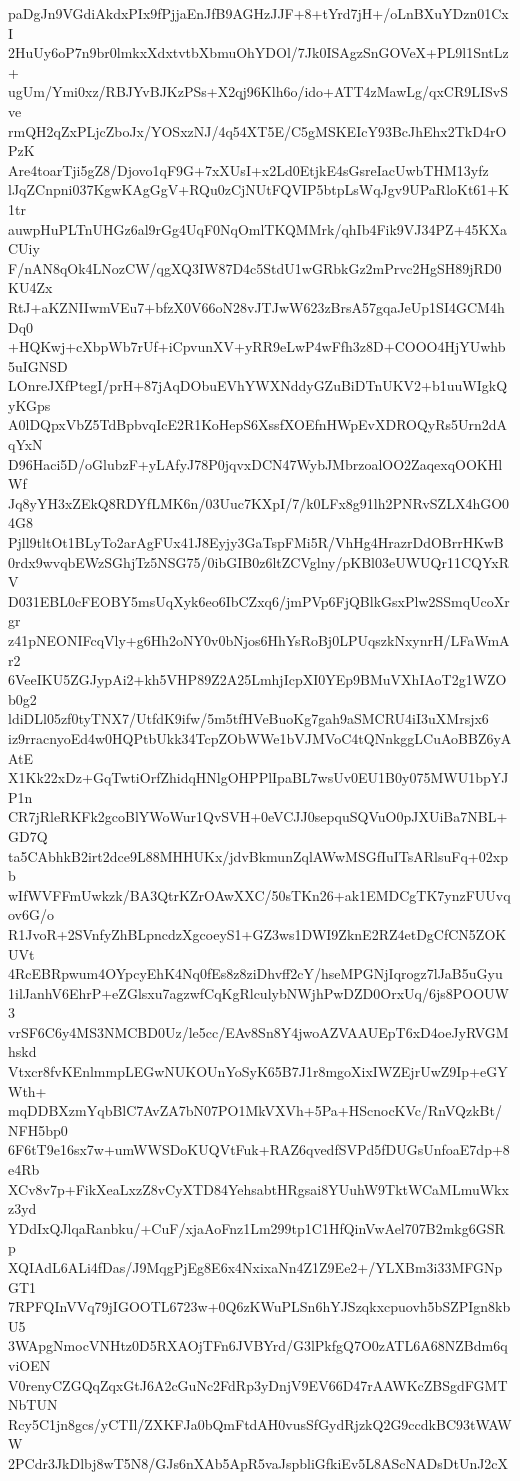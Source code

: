 paDgJn9VGdiAkdxPIx9fPjjaEnJfB9AGHzJJF+8+tYrd7jH+/oLnBXuYDzn01CxI
2HuUy6oP7n9br0lmkxXdxtvtbXbmuOhYDOl/7Jk0ISAgzSnGOVeX+PL9l1SntLz+
ugUm/Ymi0xz/RBJYvBJKzPSs+X2qj96Klh6o/ido+ATT4zMawLg/qxCR9LISvSve
rmQH2qZxPLjcZboJx/YOSxzNJ/4q54XT5E/C5gMSKEIcY93BcJhEhx2TkD4rOPzK
Are4toarTji5gZ8/Djovo1qF9G+7xXUsI+x2Ld0EtjkE4sGsreIacUwbTHM13yfz
lJqZCnpni037KgwKAgGgV+RQu0zCjNUtFQVIP5btpLsWqJgv9UPaRloKt61+K1tr
auwpHuPLTnUHGz6al9rGg4UqF0NqOmlTKQMMrk/qhIb4Fik9VJ34PZ+45KXaCUiy
F/nAN8qOk4LNozCW/qgXQ3IW87D4c5StdU1wGRbkGz2mPrvc2HgSH89jRD0KU4Zx
RtJ+aKZNIIwmVEu7+bfzX0V66oN28vJTJwW623zBrsA57gqaJeUp1SI4GCM4hDq0
+HQKwj+cXbpWb7rUf+iCpvunXV+yRR9eLwP4wFfh3z8D+COOO4HjYUwhb5uIGNSD
LOnreJXfPtegI/prH+87jAqDObuEVhYWXNddyGZuBiDTnUKV2+b1uuWIgkQyKGps
A0lDQpxVbZ5TdBpbvqIcE2R1KoHepS6XssfXOEfnHWpEvXDROQyRs5Urn2dAqYxN
D96Haci5D/oGlubzF+yLAfyJ78P0jqvxDCN47WybJMbrzoalOO2ZaqexqOOKHlWf
Jq8yYH3xZEkQ8RDYfLMK6n/03Uuc7KXpI/7/k0LFx8g91lh2PNRvSZLX4hGO04G8
Pjll9tltOt1BLyTo2arAgFUx41J8Eyjy3GaTspFMi5R/VhHg4HrazrDdOBrrHKwB
0rdx9wvqbEWzSGhjTz5NSG75/0ibGIB0z6ltZCVglny/pKBl03eUWUQr11CQYxRV
D031EBL0cFEOBY5msUqXyk6eo6IbCZxq6/jmPVp6FjQBlkGsxPlw2SSmqUcoXrgr
z41pNEONIFcqVly+g6Hh2oNY0v0bNjos6HhYsRoBj0LPUqszkNxynrH/LFaWmAr2
6VeeIKU5ZGJypAi2+kh5VHP89Z2A25LmhjIcpXI0YEp9BMuVXhIAoT2g1WZOb0g2
ldiDLl05zf0tyTNX7/UtfdK9ifw/5m5tfHVeBuoKg7gah9aSMCRU4iI3uXMrsjx6
iz9rracnyoEd4w0HQPtbUkk34TcpZObWWe1bVJMVoC4tQNnkggLCuAoBBZ6yAAtE
X1Kk22xDz+GqTwtiOrfZhidqHNlgOHPPlIpaBL7wsUv0EU1B0y075MWU1bpYJP1n
CR7jRleRKFk2gcoBlYWoWur1QvSVH+0eVCJJ0sepquSQVuO0pJXUiBa7NBL+GD7Q
ta5CAbhkB2irt2dce9L88MHHUKx/jdvBkmunZqlAWwMSGfIuITsARlsuFq+02xpb
wIfWVFFmUwkzk/BA3QtrKZrOAwXXC/50sTKn26+ak1EMDCgTK7ynzFUUvqov6G/o
R1JvoR+2SVnfyZhBLpncdzXgcoeyS1+GZ3ws1DWI9ZknE2RZ4etDgCfCN5ZOKUVt
4RcEBRpwum4OYpcyEhK4Nq0fEs8z8ziDhvff2cY/hseMPGNjIqrogz7lJaB5uGyu
1ilJanhV6EhrP+eZGlsxu7agzwfCqKgRlculybNWjhPwDZD0OrxUq/6js8POOUW3
vrSF6C6y4MS3NMCBD0Uz/le5cc/EAv8Sn8Y4jwoAZVAAUEpT6xD4oeJyRVGMhskd
Vtxcr8fvKEnlmmpLEGwNUKOUnYoSyK65B7J1r8mgoXixIWZEjrUwZ9Ip+eGYWth+
mqDDBXzmYqbBlC7AvZA7bN07PO1MkVXVh+5Pa+HScnocKVc/RnVQzkBt/NFH5bp0
6F6tT9e16sx7w+umWWSDoKUQVtFuk+RAZ6qvedfSVPd5fDUGsUnfoaE7dp+8e4Rb
XCv8v7p+FikXeaLxzZ8vCyXTD84YehsabtHRgsai8YUuhW9TktWCaMLmuWkxz3yd
YDdIxQJlqaRanbku/+CuF/xjaAoFnz1Lm299tp1C1HfQinVwAel707B2mkg6GSRp
XQIAdL6ALi4fDas/J9MqgPjEg8E6x4NxixaNn4Z1Z9Ee2+/YLXBm3i33MFGNpGT1
7RPFQInVVq79jIGOOTL6723w+0Q6zKWuPLSn6hYJSzqkxcpuovh5bSZPIgn8kbU5
3WApgNmocVNHtz0D5RXAOjTFn6JVBYrd/G3lPkfgQ7O0zATL6A68NZBdm6qviOEN
V0renyCZGQqZqxGtJ6A2cGuNc2FdRp3yDnjV9EV66D47rAAWKcZBSgdFGMTNbTUN
Rcy5C1jn8gcs/yCTIl/ZXKFJa0bQmFtdAH0vusSfGydRjzkQ2G9ccdkBC93tWAWW
2PCdr3JkDlbj8wT5N8/GJs6nXAb5ApR5vaJspbliGfkiEv5L8AScNADsDtUnJ2cX
